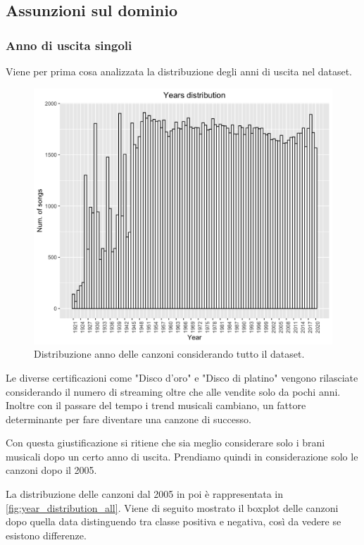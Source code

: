 \subsection{Assunzioni sul dominio}
\label{sec:assunzioni}
\subsubsection{Anno di uscita singoli}
Viene per prima cosa analizzata la distribuzione degli anni di uscita nel dataset.

\begin{figure}[H]
	\centering
	\includegraphics[width=13cm]{../images/years_distribution.png}
	\caption{Distribuzione anno delle canzoni considerando tutto il dataset.}
	\label{fig:year_distribution_all}
\end{figure}

Le diverse certificazioni come "Disco d'oro" e "Disco di platino"
vengono rilasciate considerando il numero di streaming oltre che alle
vendite solo da pochi anni. Inoltre con il passare del tempo i trend
musicali cambiano, un fattore determinante per fare diventare una
canzone di successo.

Con questa giustificazione si ritiene che sia meglio considerare solo
i brani musicali dopo un certo anno di uscita. Prendiamo quindi in
considerazione solo le canzoni dopo il 2005.

La distribuzione delle canzoni dal 2005 in poi è rappresentata in
\autoref{fig:year_distribution_all}. Viene di seguito mostrato il
boxplot delle canzoni dopo quella data distinguendo tra classe
positiva e negativa, così da vedere se esistono differenze.

